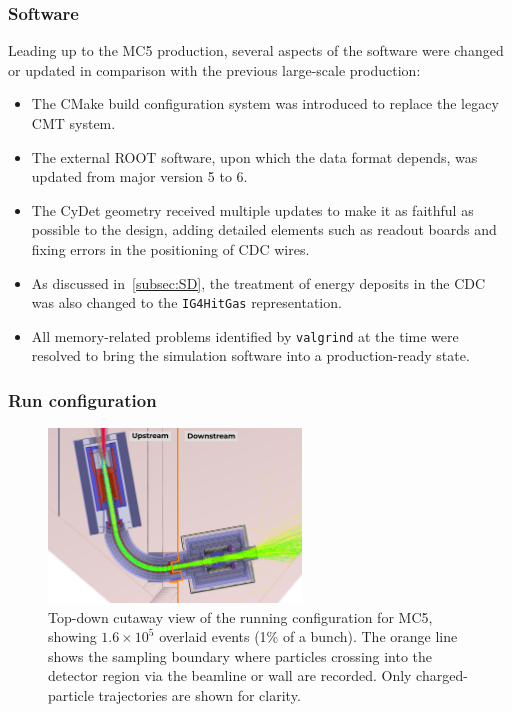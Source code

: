 \subsubsection{Software}
Leading up to the MC5 production, several aspects of the software were changed or updated in comparison with the previous large-scale production:
\begin{itemize}
    \item The CMake build configuration system was introduced to replace the legacy CMT system. 
    \item The external ROOT software, upon which the \oaEvent data format depends, was updated from major version 5 to 6.
    \item The CyDet geometry received multiple updates to make it as faithful as possible to the design, adding detailed elements such as readout boards and fixing errors in the positioning of CDC wires. 
    \item As discussed in~\ref{subsec:SD}, the treatment of energy deposits in the CDC was also changed to the \texttt{IG4HitGas} representation.
    \item All memory-related problems identified by \texttt{valgrind} at the time were resolved to bring the simulation software into a production-ready state.
\end{itemize}

\subsubsection{Run configuration}

\begin{figure}
    \centering
    \includegraphics[width=0.6\textwidth]{chapter3/sampling_plane_illu_ink.pdf}
    \caption{Top-down cutaway view of the running configuration for MC5, showing $1.6\times 10^5$ overlaid events (1\% of a bunch). The orange line shows the sampling boundary where particles crossing into the detector region via the beamline or wall are recorded. Only charged-particle trajectories are shown for clarity.}
    \label{fig:Phase-I Sampling World}
\end{figure}



